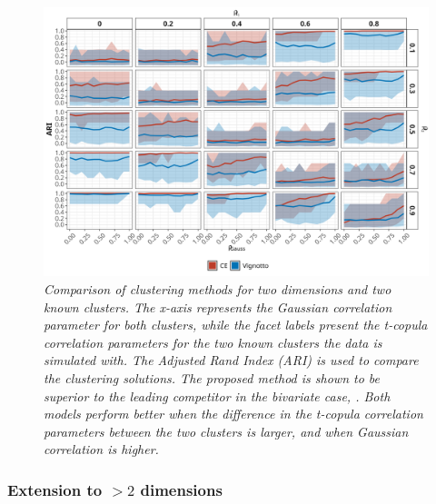 \documentclass{article}
\numberwithin{equation}{section}
\begin{document}
\begin{figure}[H]
    \centering
    \includegraphics[width = 0.9\linewidth]{plots/sim_01b_ce_vs_vi_dqu_0.9.png}
    \caption{\emph{Comparison of clustering methods for two dimensions and two known clusters. The x-axis represents the Gaussian correlation parameter for both clusters, while the facet labels present the t-copula correlation parameters for the two known clusters the data is simulated with. The Adjusted Rand Index (ARI) is used to compare the clustering solutions. The proposed method is shown to be superior to the leading competitor in the bivariate case, \cite{Vignotto2021}. Both models perform better when the difference in the t-copula correlation parameters between the two clusters is larger, and when Gaussian correlation is higher.}}
    \label{fig:01_ce_vs_vi}
\end{figure}


\subsubsection{Extension to $>2$ dimensions} \label{subsubsec:sim_extension}

\end{document}
